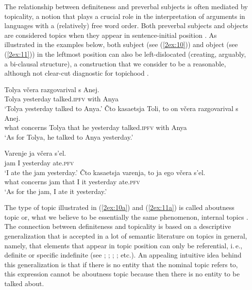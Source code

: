 \documentclass[output=paper]{langsci/langscibook}
\begin{document}
The relationship between definiteness and preverbal subjects is often mediated by topicality, a notion that plays a crucial role in the interpretation of arguments in languages with a (relatively) free word order. Both preverbal subjects and objects are considered topics when they appear in sentence-initial position \citep[][]{jasinskaja:14}. As illustrated in the examples below, both subject (see (\ref{2ex:10})) and object (see (\ref{2ex:11})) in the leftmost position can also be left-dislocated (creating, arguably, a bi-clausal structure), a construction that we consider to be a reasonable, although not clear-cut diagnostic for topichood \citep[][]{reinhart:81}.

\begin{exe}
\ex\label{2ex:10}
	\begin{xlista}
	\ex\label{2ex:10a}
	\gll	Tolya v\v{c}era 		razgovarival 	s 	Anej. \\
		Tolya yesterday 	talked.{\textsc{ipfv}} 	with	Anya 	\\
	\glt	`Tolya yesterday talked to Anya.'
	\ex\label{2ex:10b}
	\gll 	\v{C}to	kasaetsja	Toli, 		to 	on	v\v{c}era 	razgovarival 	s 	Anej. \\
		what 	concerns 	Tolya 	that	he	yesterday	talked.{\textsc{ipfv}} 	with	Anya \\
	\glt	`As for Tolya, he talked to Anya yesterday.'
	\end{xlista}
\ex\label{2ex:11}
	\begin{xlista}
	\ex\label{2ex:11a}
	\gll	Varenje	ja	v\v{c}era 	s'el. \\
		jam 		I 	yesterday 	ate.{\textsc{pfv}} \\
	\glt	`I ate the jam yesterday.'
	\ex\label{2ex:11b}
	\gll	\v{C}to 	kasaetsja	varenja, 	to 	ja	ego 	v\v{c}era 	s'el. \\
		what 	concerns 	jam 		that 	I 	it 	yesterday 	ate.{\textsc{pfv}} \\
	\glt	`As for the jam, I ate it yesterday.'
	\end{xlista}
\end{exe}

The type of topic illustrated in (\ref{2ex:10a}) and (\ref{2ex:11a}) is called aboutness topic \citep{reinhart:81} or, what we believe to be essentially the same phenomenon, internal topics \citep{king:95}. The connection between definiteness and topicality is based on a descriptive generalization that is accepted in a lot of semantic literature on topics in general, namely, that elements that appear in topic position can only be referential, i.\,e., definite or specific indefinite (see \citealt{reinhart:81}; \citealt{erteschik:shir:97}; \citealt{portner:yabushita:01}; \citealt{endriss:09}; etc.). An appealing intuitive idea behind this generalization is that if there is no entity that the nominal topic refers to, this expression cannot be aboutness topic because then there is no entity to be talked about.
\end{document}
